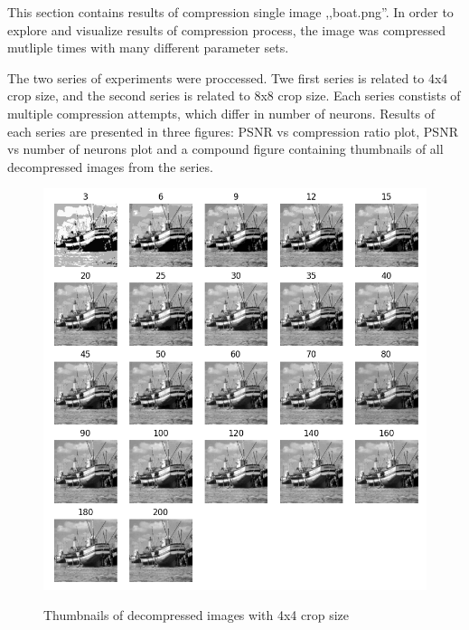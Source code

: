 \documentclass[../IDP_Task5_Karwowski_Kowalewski.tex]{subfiles}
\begin{document}
 {
    This section contains results of compression single image ,,boat.png''. In order to explore and
    visualize results of compression process, the image was compressed mutliple times with many
    different parameter sets. 

    The two series of experiments were proccessed. Twe first series is related to 4x4 crop size, and
    the second series is related to 8x8 crop size. Each series constists of multiple compression
    attempts, which differ in number of neurons. Results of each series are presented in three
    figures: PSNR vs compression ratio plot, PSNR vs number of neurons plot and a compound figure
    containing thumbnails of all decompressed images from the series.

    \begin{figure}[!htbp]
        \centering
        \includegraphics[width=\textwidth]{img/karwowski/4x4_images}
        \label{fig:4x4_images}
        \caption{Thumbnails of decompressed images with 4x4 crop size}
    \end{figure}
    
}
\end{document}
